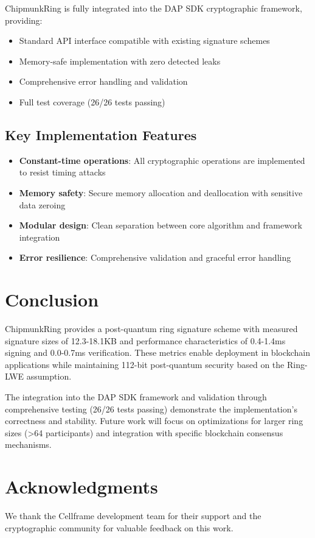 \documentclass[11pt,a4paper]{article}
\begin{document}
ChipmunkRing is fully integrated into the DAP SDK cryptographic framework, providing:

\begin{itemize}
\item Standard API interface compatible with existing signature schemes
\item Memory-safe implementation with zero detected leaks
\item Comprehensive error handling and validation
\item Full test coverage (26/26 tests passing)
\end{itemize}

\subsection{Key Implementation Features}

\begin{itemize}
\item \textbf{Constant-time operations}: All cryptographic operations are implemented to resist timing attacks
\item \textbf{Memory safety}: Secure memory allocation and deallocation with sensitive data zeroing
\item \textbf{Modular design}: Clean separation between core algorithm and framework integration
\item \textbf{Error resilience}: Comprehensive validation and graceful error handling
\end{itemize}

\section{Conclusion}

ChipmunkRing provides a post-quantum ring signature scheme with measured signature sizes of 12.3-18.1KB and performance characteristics of 0.4-1.4ms signing and 0.0-0.7ms verification. These metrics enable deployment in blockchain applications while maintaining 112-bit post-quantum security based on the Ring-LWE assumption.

The integration into the DAP SDK framework and validation through comprehensive testing (26/26 tests passing) demonstrate the implementation's correctness and stability. Future work will focus on optimizations for larger ring sizes (>64 participants) and integration with specific blockchain consensus mechanisms.

\section{Acknowledgments}

We thank the Cellframe development team for their support and the cryptographic community for valuable feedback on this work.



\end{document}
